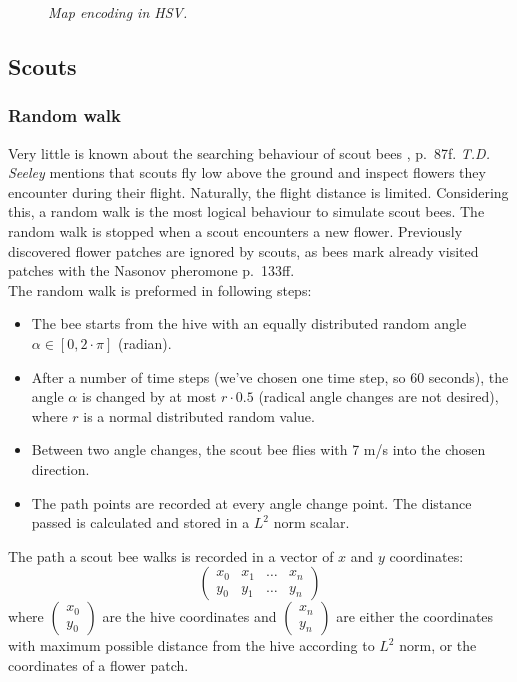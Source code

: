	\begin{figure}[h]
		\centering
		\caption{\textit{Map encoding in HSV.}}
		\label{fig:hsvEncoding}
	\end{figure}
	
	
\subsection{Scouts}
	\subsubsection{Random walk}
		Very little is known about the searching behaviour of scout bees \cite{seeley95}, p.~87f. \textit{T.D. Seeley} mentions that scouts fly low above the ground and inspect flowers they encounter during their flight. Naturally, the flight distance is limited. Considering this, a random walk is the most logical behaviour to simulate scout bees. The random walk is stopped when a scout encounters a new flower. Previously discovered flower patches are ignored by scouts, as bees mark already visited patches with the Nasonov pheromone \cite{winston91} p.~133ff.\\
		The random walk is preformed in following steps:
		\begin{itemize}
			\item The bee starts from the hive with an equally distributed random angle $\alpha \in [0, 2 \cdot \pi]$ (radian).
			\item After a number of time steps (we've chosen one time step, so 60 seconds), the angle $\alpha$ is changed by at most $r\cdot0.5$ (radical angle changes are not desired), where $r$ is a normal distributed random value.
			\item Between two angle changes, the scout bee flies with 7 m/s into the chosen direction.
			\item The path points are recorded at every angle change point. The distance passed is calculated and stored in a $L^2$ norm scalar.
		\end{itemize}
		
		The path a scout bee walks is recorded in a vector of $x$ and $y$ coordinates:
		\[\begin{pmatrix}
			x_0 & x_1 & \ldots & x_n \\ y_0 & y_1 & \ldots & y_n
		\end{pmatrix}\]
		where $\begin{pmatrix} x_0 \\ y_0 \end{pmatrix}$ are the hive coordinates and $\begin{pmatrix} x_n \\ y_n \end{pmatrix}$ are either the coordinates with maximum possible distance from the hive according to $L^2$ norm, or the coordinates of a flower patch.\\
		
